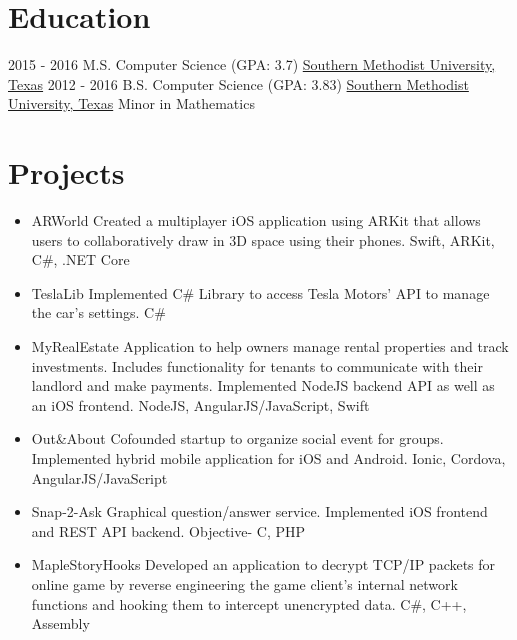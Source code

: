 \documentclass[letterpaper]{resume}
\begin{document}
\section{Education}
\begin{twenty} %
	\twentyitem
	{2015 - 2016}
	{}
	{M.S. Computer Science \textnormal{(GPA: 3.7)}}
	{\href{http://www.smu.edu/}{Southern Methodist University, Texas}}
	{}
	{}
	\twentyitem
	{2012 - 2016}
	{}
	{B.S. Computer Science \textnormal{(GPA: 3.83)}}
	{\href{http://www.smu.edu/}{Southern Methodist University, Texas}}
	{Minor in Mathematics}
	{}
\end{twenty}





\section{Projects}
{\begin{itemize}
		\item ARWorld Created a multiplayer iOS application using ARKit that allows users to collaboratively draw in 3D space using their phones. Swift, ARKit, C\#, .NET Core
		
		\item TeslaLib Implemented C\# Library to access Tesla Motors’ API to manage the car’s settings. C\#
		
		\item MyRealEstate Application to help owners manage rental properties and track investments. Includes functionality
		for tenants to communicate with their landlord and make payments. Implemented NodeJS backend API
		as well as an iOS frontend. NodeJS, AngularJS/JavaScript, Swift
		
		\item Out\&About Cofounded startup to organize social event for groups. Implemented hybrid mobile application for
		iOS and Android. Ionic, Cordova, AngularJS/JavaScript
		
		\item Snap-2-Ask Graphical question/answer service. Implemented iOS frontend and REST API backend. Objective-
		C, PHP
	
		\item MapleStoryHooks Developed an application to decrypt TCP/IP packets for online game by reverse engineering
		the game client’s internal network functions and hooking them to intercept unencrypted data. C\#, C++, Assembly
\end{itemize}}
		
\end{document}
